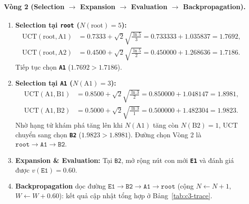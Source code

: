 \paragraph{Vòng 2 (Selection $\to$ Expansion $\to$ Evaluation $\to$ Backpropagation).}
\begin{enumerate}
  \item \textbf{Selection tại \texttt{root} ($N(\text{root}) = 5$):}
  \begin{align*}
    \text{UCT}(\text{root}, \text{A1}) &= 0.7333 + \sqrt{2}\sqrt{\frac{\ln 5}{3}} = 0.733333 + 1.035837 = 1.7692, \\
    \text{UCT}(\text{root}, \text{A2}) &= 0.4500 + \sqrt{2}\sqrt{\frac{\ln 5}{2}} = 0.450000 + 1.268636 = 1.7186.
  \end{align*}
  Tiếp tục chọn \textbf{\texttt{A1}} ($1.7692 > 1.7186$).
  \item \textbf{Selection tại \texttt{A1} ($N(\text{A1}) = 3$):}
  \begin{align*}
    \text{UCT}(\text{A1}, \text{B1}) &= 0.8500 + \sqrt{2}\sqrt{\frac{\ln 3}{2}} = 0.850000 + 1.048147 = 1.8981, \\
    \text{UCT}(\text{A1}, \text{B2}) &= 0.5000 + \sqrt{2}\sqrt{\frac{\ln 3}{1}} = 0.500000 + 1.482304 = 1.9823.
  \end{align*}
  Nhờ hạng tử khám phá tăng lên khi $N(\text{A1})$ tăng còn $N(\text{B2})=1$, UCT chuyển sang chọn \textbf{\texttt{B2}} ($1.9823 > 1.8981$). Đường chọn Vòng 2 là $\texttt{root} \to \texttt{A1} \to \texttt{B2}$.
  \item \textbf{Expansion \& Evaluation:} Tại \texttt{B2}, mở rộng nút con mới \textbf{\texttt{E1}} và đánh giá được $v(\texttt{E1}) = 0.60$.
  \item \textbf{Backpropagation} dọc đường $\texttt{E1} \to \texttt{B2} \to \texttt{A1} \to \texttt{root}$ (cộng $N \leftarrow N+1$, $W \leftarrow W+0.60$): kết quả cập nhật tổng hợp ở Bảng~\ref{tab:c3-trace}.
\end{enumerate}


